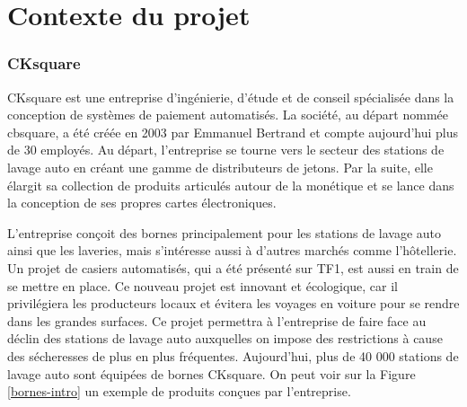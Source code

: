 \documentclass[a4paper]{article}
\begin{document}
\clearpage{}



\part{Contexte du projet}

\section{CKsquare}%

CKsquare est une entreprise d'ingénierie, d'étude et de conseil spécialisée dans
la conception de systèmes de paiement automatisés. La société, au départ nommée
cbsquare, a été créée en 2003 par Emmanuel Bertrand et compte aujourd'hui plus
de 30 employés. Au départ, l'entreprise se tourne vers le secteur des stations
de lavage auto en créant une gamme de distributeurs de jetons. Par la suite,
elle élargit sa collection de produits articulés autour de la monétique et se
lance dans la conception de ses propres cartes électroniques.

L'entreprise conçoit des bornes principalement pour les stations de lavage auto
ainsi que les laveries, mais s'intéresse aussi à d'autres marchés comme
l'hôtellerie. Un projet de casiers automatisés, qui a été présenté sur TF1, est
aussi en train de se mettre en place. Ce nouveau projet est innovant et
écologique, car il privilégiera les producteurs locaux et évitera les voyages en
voiture pour se rendre dans les grandes surfaces. Ce projet permettra à
l'entreprise de faire face au déclin des stations de lavage auto auxquelles on
impose des restrictions à cause des sécheresses de plus en plus fréquentes.
Aujourd'hui, plus de 40 000 stations de lavage auto sont équipées de bornes
CKsquare. On peut voir sur la Figure \ref{bornes-intro} un exemple de produits
conçues par l'entreprise.
\end{document}
